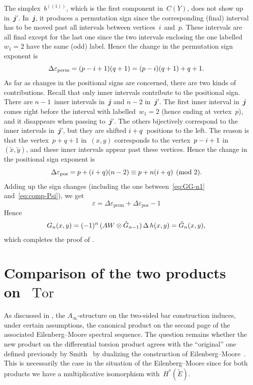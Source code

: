 \documentclass[letterpaper]{amsart}
\numberwithin{equation}{section}
\theoremstyle{plain}
\theoremstyle{definition}
\theoremstyle{remark}
\let\epsilon\varepsilon
\DeclareMathOperator{\Tor}{Tor}
\def\Ainf{A_{\infty}}
\def\jj{\mathbfit{j}}
\def\sweehgc#1#2{#1^{(\!(#2)\!)}}
\def\AW{AW}
\def\gE{\tilde{E}}
\begin{document}
The simplex~$\sweehgc{b}{1}$, which is the first component in~$C(Y)$, does not show up in~$\jj'$. In~$\jj$, it produces a permutation sign
since the corresponding (final) interval has to be moved past all intervals between vertices~$i$ and~$p$.
These intervals are all final except for the last one since the two intervals enclosing the one labelled~$w_{1}=2$ have the same (odd) label.
Hence the change in the permutation sign exponent is
\begin{equation}
  \label{eq:delta-perm}
  \Delta\epsilon_{\mathrm{perm}} = (p-\si+1)(q+1) = (p-\si)(q+1)+q+1.
\end{equation}
As far as changes in the positional signs are concerned, there are two kinds of contributions.
Recall that only inner intervals contribute to the positional sign.
There are $n-1$~inner intervals in~$\jj$ and $n-2$ in~$\jj'$.
The first inner interval in~$\jj$ comes right before the interval with labelled~$w_{1}=2$ (hence ending at vertex~$p$),
and it disappears when passing to~$\jj'$. The others bijectively correspond to the inner intervals in~$\jj'$,
but they are shifted $i+q$~positions to the left. The reason is that the vertex~$p+q+1$ in~$(x,y)$
corresponds to the vertex~$p-i+1$ in~$(\tilde{x},\tilde{y})$, and these inner intervals appear past these vertices.
Hence the change in the positional sign exponent is
\begin{equation}
  \label{eq:delta-pos}
  \Delta\epsilon_{\mathrm{pos}} = p + (\si+q)(n-2) \equiv p + n(\si+q) \pmod{2}.
\end{equation}
Adding up the sign changes (including the one between~\eqref{eq:GG-n1} and~\eqref{eq:comp-Psi}), we get
\begin{equation}
  \epsilon = \Delta\epsilon_{\mathrm{perm}} + \Delta\epsilon_{\mathrm{pos}} - 1
\end{equation}
Hence
\begin{equation}
  G_{n}(x,y) = (-1)^{n}\,(\AW \otimes\GG_{n-1})\,\Delta\,h(x,y) = \GG_{n}(x,y),
\end{equation}
which completes the proof of .



\section{Comparison of the two products on~\texorpdfstring{$\Tor$}{Tor}}
\label{sec:compare-prod}

As discussed in , the $\Ainf$-structure on the two-sided bar construction
induces, under certain assumptions,
the canonical product on the second page of the associated Eilenberg--Moore spectral sequence.
The question remains whether the new product on the differential torsion product agrees with
the ``original'' one defined previously by Smith~\cite{Smith:1967}
by dualizing the construction of Eilenberg--Moore~\cite[Sec.~18]{EilenbergMoore:1966}.
This is necessarily the case in the situation of the Eilenberg--Moore  since
for both products we have a multiplicative isomorphism with~$H^{*}(\gE)$.
\end{document}
